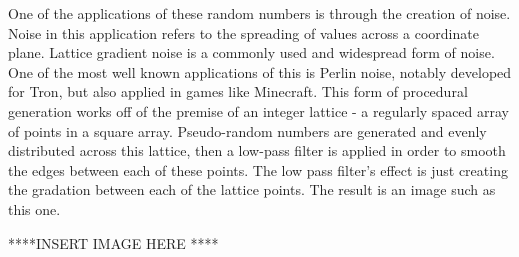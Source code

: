 \documentclass[10pt]{report}
\begin{document}
		One of the applications of these random numbers is through the creation of noise. Noise in this application refers to the spreading of values across a coordinate plane. Lattice gradient noise is a commonly used and widespread form of noise. One of the most well known applications of this is Perlin noise, notably developed for Tron, but also applied in games like Minecraft. This form of procedural generation works off of the premise of an integer lattice - a regularly spaced array of points in a square array\cite{integer-lattice}. Pseudo-random numbers are generated and evenly distributed across this lattice, then a low-pass filter is applied in order to smooth the edges between each of these points. The low pass filter's effect is just creating the gradation between each of the lattice points. The result is an image such as this one.
		
		****INSERT IMAGE HERE ****
\end{document}
